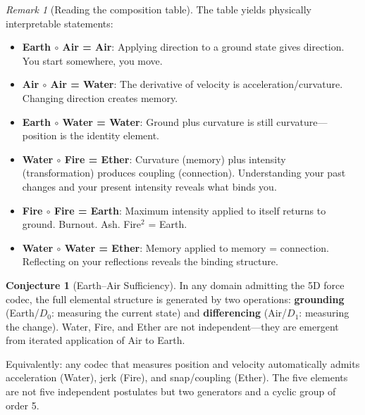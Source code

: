 \documentclass[11pt]{article}
\theoremstyle{definition}
\newtheorem{conjecture}[theorem]{Conjecture}
\theoremstyle{remark}
\newtheorem{remark}[theorem]{Remark}
\begin{document}
\begin{remark}[Reading the composition table]
The table yields physically interpretable statements:
\begin{itemize}[nosep]
  \item \textbf{Earth $\circ$ Air = Air}: Applying direction to a ground
    state gives direction.  You start somewhere, you move.
  \item \textbf{Air $\circ$ Air = Water}: The derivative of velocity is
    acceleration/curvature.  Changing direction creates memory.
  \item \textbf{Earth $\circ$ Water = Water}: Ground plus curvature is still
    curvature---position is the identity element.
  \item \textbf{Water $\circ$ Fire = Ether}: Curvature (memory) plus
    intensity (transformation) produces coupling (connection).  Understanding
    your past changes and your present intensity reveals what binds you.
  \item \textbf{Fire $\circ$ Fire = Earth}: Maximum intensity applied to
    itself returns to ground.  Burnout.  Ash.  Fire$^2$ = Earth.
  \item \textbf{Water $\circ$ Water = Ether}: Memory applied to memory =
    connection.  Reflecting on your reflections reveals the binding structure.
\end{itemize}
\end{remark}

\begin{conjecture}[Earth--Air Sufficiency]
\label{conj:earth-air}
In any domain admitting the 5D force codec, the full elemental structure is
generated by two operations: \textbf{grounding} (Earth/$D_0$: measuring the
current state) and \textbf{differencing} (Air/$D_1$: measuring the change).
Water, Fire, and Ether are not independent---they are emergent from iterated
application of Air to Earth.

Equivalently: any codec that measures position and velocity automatically
admits acceleration (Water), jerk (Fire), and snap/coupling (Ether).  The
five elements are not five independent postulates but two generators and
a cyclic group of order 5.
\end{conjecture}
\end{document}
